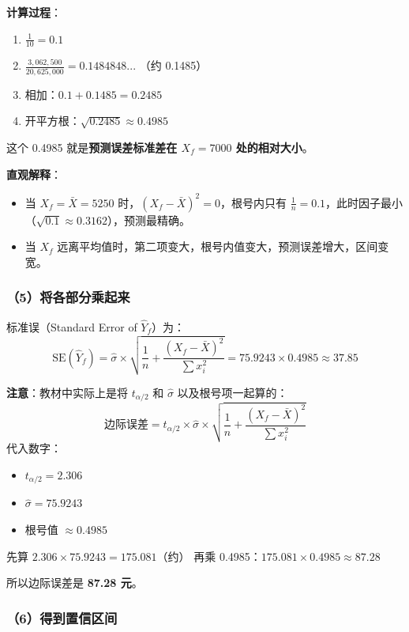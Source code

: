 \documentclass[12pt,a4paper]{article}
\begin{document}
\textbf{计算过程}：
\begin{enumerate}
\item \(\frac{1}{10} = 0.1\)
\item \(\frac{3,062,500}{20,625,000} = 0.1484848...\) （约 0.1485）
\item 相加：\(0.1 + 0.1485 = 0.2485\)
\item 开平方根：\(\sqrt{0.2485} \approx 0.4985\)
\end{enumerate}

这个 0.4985 就是\textbf{预测误差标准差在 \(X_f = 7000\) 处的相对大小}。

\textbf{直观解释}：
\begin{itemize}
\item 当 \(X_f = \bar{X} = 5250\) 时，\((X_f - \bar{X})^2 = 0\)，根号内只有 \(\frac{1}{n} = 0.1\)，此时因子最小（\(\sqrt{0.1} \approx 0.3162\)），预测最精确。
\item 当 \(X_f\) 远离平均值时，第二项变大，根号内值变大，预测误差增大，区间变宽。
\end{itemize}

\subsubsection*{（5）将各部分乘起来}

标准误（Standard Error of \(\hat{Y}_f\)）为：
\[
\text{SE}(\hat{Y}_f) = \hat{\sigma} \times \sqrt{ \frac{1}{n} + \frac{(X_f - \bar{X})^2}{\sum x_i^2} } = 75.9243 \times 0.4985 \approx 37.85
\]

\textbf{注意}：教材中实际上是将 \(t_{\alpha/2}\) 和 \(\hat{\sigma}\) 以及根号项一起算的：
\[
\text{边际误差} = t_{\alpha/2} \times \hat{\sigma} \times \sqrt{ \frac{1}{n} + \frac{(X_f - \bar{X})^2}{\sum x_i^2} }
\]
代入数字：
\begin{itemize}
\item \(t_{\alpha/2} = 2.306\)
\item \(\hat{\sigma} = 75.9243\)
\item 根号值 \(\approx 0.4985\)
\end{itemize}

先算 \(2.306 \times 75.9243 = 175.081\)（约）
再乘 0.4985：\(175.081 \times 0.4985 \approx 87.28\)

所以边际误差是 \textbf{87.28 元}。

\subsubsection*{（6）得到置信区间}
\end{document}
